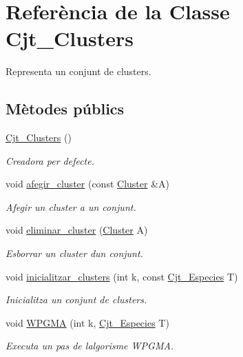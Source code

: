 \hypertarget{class_cjt___clusters}{}\section{Referència de la Classe Cjt\+\_\+\+Clusters}
\label{class_cjt___clusters}


Representa un conjunt de clusters.  


\subsection*{Mètodes públics}
\begin{DoxyCompactItemize}
\item 
\hyperlink{class_cjt___clusters_a2e55759944a78043744103e19dd87c1c}{Cjt\+\_\+\+Clusters} ()
\begin{DoxyCompactList}\small\item\em Creadora per defecte. \end{DoxyCompactList}\item 
void \hyperlink{class_cjt___clusters_a0f77012c09e43a3be17043ddf4ac061c}{afegir\+\_\+cluster} (const \hyperlink{class_cluster}{Cluster} \&A)
\begin{DoxyCompactList}\small\item\em Afegir un cluster a un conjunt. \end{DoxyCompactList}\item 
void \hyperlink{class_cjt___clusters_ae29d4a65bc134e2b23a41802f079ec96}{eliminar\+\_\+cluster} (\hyperlink{class_cluster}{Cluster} A)
\begin{DoxyCompactList}\small\item\em Esborrar un cluster d\textquotesingle{}un conjunt. \end{DoxyCompactList}\item 
void \hyperlink{class_cjt___clusters_abe1554d9fdd2d6b2e67d9ddd7b316903}{inicialitzar\+\_\+clusters} (int k, const \hyperlink{class_cjt___especies}{Cjt\+\_\+\+Especies} T)
\begin{DoxyCompactList}\small\item\em Inicialitza un conjunt de clusters. \end{DoxyCompactList}\item 
void \hyperlink{class_cjt___clusters_a71ecc2306fc74d8d8308a034735bf894}{W\+P\+G\+MA} (int k, \hyperlink{class_cjt___especies}{Cjt\+\_\+\+Especies} T)
\begin{DoxyCompactList}\small\item\em Executa un pas de l\textquotesingle{}algorisme W\+P\+G\+MA. \end{DoxyCompactList}\item 

\end{DoxyCompactItemize}
